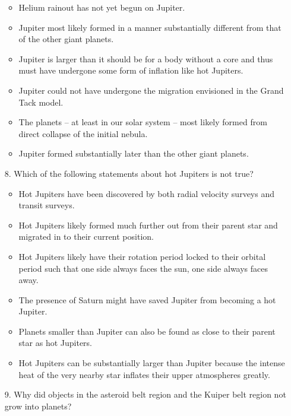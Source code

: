 \begin{enumerate}
    \begin{itemize}[label={$\bullet$}]
        \item Helium rainout has not yet begun on Jupiter.
        \item Jupiter most likely formed in a manner substantially different from that of the other giant planets.
        \item Jupiter is larger than it should be for a body without a core and thus must have undergone some form of inflation like hot Jupiters.
        \item Jupiter could not have undergone the migration envisioned in the Grand Tack model.
        \item The planets – at least in our solar system – most likely formed from direct collapse of the initial nebula.
        \item Jupiter formed substantially later than the other giant planets.
    \end{itemize}
    
    \item[8.] Which of the following statements about hot Jupiters is not true?
    
    \begin{itemize}[label={$\bullet$}]
        \item Hot Jupiters have been discovered by both radial velocity surveys and transit surveys.
        \item Hot Jupiters likely formed much further out from their parent star and migrated in to their current position.
        \item Hot Jupiters likely have their rotation period locked to their orbital period such that one side always faces the sun, one side always faces away. 
        \item The presence of Saturn might have saved Jupiter from becoming a hot Jupiter.
        \item Planets smaller than Jupiter can also be found as close to their parent star as hot Jupiters.
        \item Hot Jupiters can be substantially larger than Jupiter because the intense heat of the very nearby star inflates their upper atmospheres greatly.
    \end{itemize}
    
    \item[9.] Why did objects in the asteroid belt region and the Kuiper belt region not grow into planets?
    

\end{enumerate}
